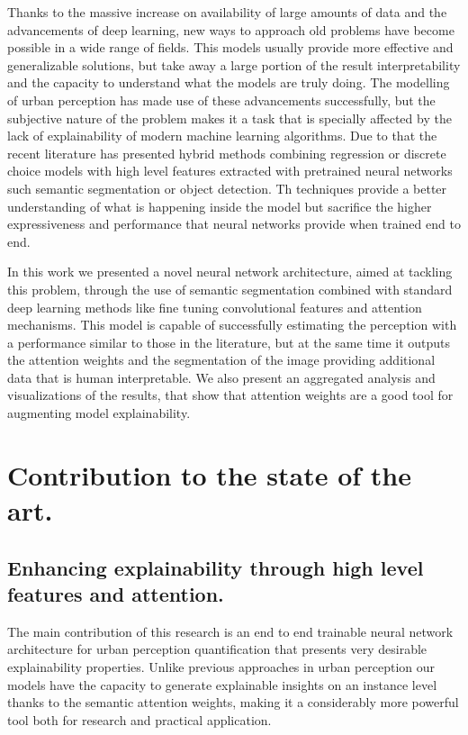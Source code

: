 Thanks to the massive increase on availability of large amounts of data and the advancements
of deep learning, new ways to approach old problems have become possible in a wide
range of fields. This models usually provide more effective and generalizable solutions,
but take away a large portion of the result interpretability and the capacity to understand
what the models are truly doing. The modelling of urban perception has made use
of these advancements successfully, but the subjective nature of the problem
makes it a task that is specially affected by the lack of explainability of modern
machine learning algorithms. Due to that the recent literature has presented hybrid methods
combining regression or discrete choice models with high level features extracted
with pretrained neural networks such semantic segmentation or object detection.
Th techniques provide a better understanding of what is happening inside the model
but sacrifice the higher expressiveness and performance that neural networks
provide when trained end to end.

In this work we presented a novel neural network architecture, aimed at tackling this problem,
through the use of semantic segmentation combined with standard deep learning methods like
fine tuning convolutional features and attention mechanisms. This model is capable of
successfully estimating the perception  with a performance similar to those in the literature,
but at the same time it outputs the attention weights and the segmentation of the image providing
additional data that is human interpretable. We also present an aggregated analysis and visualizations
of the results, that show that attention weights are a good tool for augmenting model explainability.

\section{Contribution to the state of the art.}

\subsection{Enhancing explainability through high level features and attention.}
The main contribution of this research is an end to end trainable neural network
architecture for urban perception quantification that presents very desirable
explainability properties. Unlike previous approaches in urban perception our models
have the capacity to generate explainable insights on an instance level thanks to the
semantic attention weights, making it a considerably more powerful tool both
for research and practical application.

